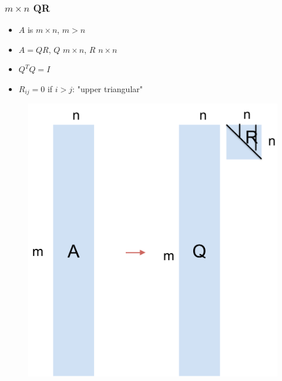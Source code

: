 \documentclass{beamer}
\begin{document}
\begin{frame}
\frametitle{$m \times n$ QR}

\begin{itemize}
\item $A$ is $m \times n$, $m > n$
\item $A = QR$, $Q$ $m \times n$, $R$ $n \times n$
\item $Q^TQ = I$
\item $R_{ij} = 0$ if $i > j$: "upper triangular"
\end{itemize}

\begin{figure}
\includegraphics[scale=0.3]{figs/tsqr.pdf}
\end{figure}

\end{frame}
\end{document}
